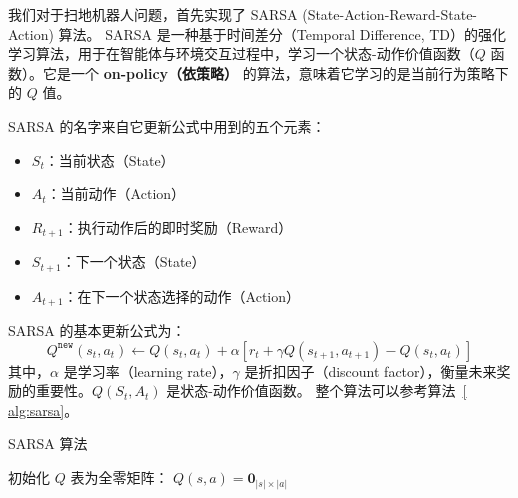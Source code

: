 我们对于扫地机器人问题，首先实现了 SARSA (State-Action-Reward-State-Action) 算法。
SARSA 是一种基于时间差分（Temporal Difference, TD）的强化学习算法，用于在智能体与环境交互过程中，学习一个状态-动作价值函数（\(Q\) 函数）。它是一个 \textbf{on-policy（依策略）} 的算法，意味着它学习的是当前行为策略下的 \(Q\) 值。

SARSA 的名字来自它更新公式中用到的五个元素：
\begin{itemize}
    \item \(S_t\)：当前状态（State）
    \item \(A_t\)：当前动作（Action）
    \item \(R_{t+1}\)：执行动作后的即时奖励（Reward）
    \item \(S_{t+1}\)：下一个状态（State）
    \item \(A_{t+1}\)：在下一个状态选择的动作（Action）
\end{itemize}

SARSA 的基本更新公式为：
\[
    Q^{\texttt{new}} \left( s_t, a_t \right) \leftarrow  Q \left( s_t, a_t \right) + \alpha \left[ r_{t} + \gamma Q \left( s_{t+1}, a_{t+1} \right) - Q \left( s_t, a_t \right) \right]
\]
其中，\(\alpha\) 是学习率（learning rate），\(\gamma\) 是折扣因子（discount factor），衡量未来奖励的重要性。\(Q \left( S_t, A_t \right)\) 是状态-动作价值函数。
整个算法可以参考算法~\ref{ alg:sarsa}。

\begin{algorithm}[htbp]
\caption{SARSA 算法}\label{alg:sarsa}

初始化 \(Q\) 表为全零矩阵： \(Q(s,a) = \mathbf{0}_{\left|s\right|\times\left|a\right|}\)\;

\end{algorithm}

